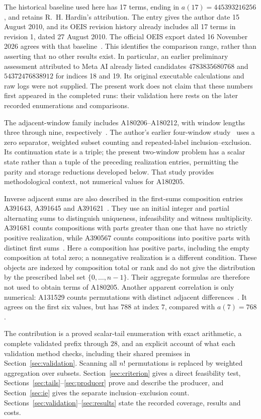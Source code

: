 \documentclass[11pt]{article}
\theoremstyle{definition}
\theoremstyle{remark}
\begin{document}
The historical baseline used here has 17 terms, ending in
$a(17)=445393216256$, and retains R.~H. Hardin's attribution.
The entry gives the author date 15 August 2010, and its OEIS revision history
already includes all 17 terms in revision 1, dated 27 August 2010.
The official OEIS export dated 16 November 2026 agrees with that
baseline~\cite{hardin}. This identifies the comparison range, rather than
asserting that no other results exist. In particular, an earlier preliminary
assessment attributed to Meta AI already listed candidates
$4783835680768$ and $54372476838912$ for indices 18 and 19.
Its original executable calculations and raw logs were not supplied.
The present work does not claim that these numbers first appeared in the
completed runs: their validation here rests on the later recorded
enumerations and comparisons.

The adjacent-window family includes A180206--A180212, with
window lengths three through nine, respectively~\cite{a180206,a180207,a180208,a180209,a180210,a180211,a180212}.
The author's earlier four-window study~\cite{four} uses a zero separator,
weighted subset counting and repeated-label inclusion--exclusion. Its
continuation state is a triple; the present two-window problem has a scalar
state rather than a tuple of the preceding realization entries, permitting
the parity and storage reductions developed below.
That study provides methodological context, not numerical values for A180205.

Inverse adjacent sums are also described in the first-sums composition
entries A391643, A391645 and A391621~\cite{a391643,a391645,a391621}. They use an initial
integer and partial alternating sums to distinguish uniqueness, infeasibility
and witness multiplicity. A391681 counts compositions with parts greater
than one that have no strictly positive realization, while A390567 counts
compositions into positive parts with distinct first sums~\cite{a391681,a390567}.
Here a composition has positive parts, including the empty composition
at total zero; a nonnegative realization is a different condition.
These objects are indexed by composition total or
rank and do not give the distribution by the prescribed label set
$\{0,\ldots,n-1\}$. Their aggregate formulas are therefore not used to
obtain terms of A180205. Another apparent correlation is only numerical:
A131529 counts permutations with distinct adjacent differences~\cite{differences}.
It agrees on the first six values, but has $788$ at index $7$, compared
with $a(7)=768$.

The contribution is a proved scalar-tail enumeration with exact arithmetic,
a complete validated prefix through $28$, and an explicit account of what
each validation method checks, including their shared premises in
Section~\ref{sec:validation}. Scanning all $n!$ permutations is replaced
by weighted aggregation over subsets. Section~\ref{sec:criterion} gives
a direct feasibility test, Sections~\ref{sec:tails}--\ref{sec:producer}
prove and describe the producer, and Section~\ref{sec:ie} gives the separate
inclusion--exclusion count. Sections~\ref{sec:validation}--\ref{sec:results}
state the recorded coverage, results and costs.
\end{document}
